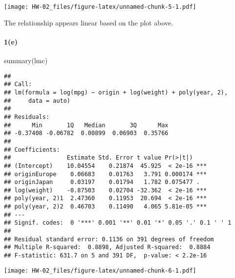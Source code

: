 \documentclass[
]{article}
\newenvironment{Shaded}{\begin{snugshade}}{\end{snugshade}}
\newcommand{\AttributeTok}[1]{\textcolor[rgb]{0.77,0.63,0.00}{#1}}
\newcommand{\DecValTok}[1]{\textcolor[rgb]{0.00,0.00,0.81}{#1}}
\newcommand{\FunctionTok}[1]{\textcolor[rgb]{0.00,0.00,0.00}{#1}}
\newcommand{\NormalTok}[1]{#1}
\newcommand{\SpecialCharTok}[1]{\textcolor[rgb]{0.00,0.00,0.00}{#1}}
\begin{document}
\texttt{[image: HW-02\_files/figure-latex/unnamed-chunk-5-1.pdf]}

The relationship appears linear based on the plot above.

\hypertarget{e}{%
\paragraph{1(e)}\label{e}}

\begin{Shaded}
\begin{Highlighting}[]
\FunctionTok{summary}\NormalTok{(lmc)}
\end{Highlighting}
\end{Shaded}

\begin{verbatim}
## 
## Call:
## lm(formula = log(mpg) ~ origin + log(weight) + poly(year, 2), 
##     data = auto)
## 
## Residuals:
##      Min       1Q   Median       3Q      Max 
## -0.37408 -0.06782  0.00899  0.06903  0.35766 
## 
## Coefficients:
##                Estimate Std. Error t value Pr(>|t|)    
## (Intercept)    10.04554    0.21874  45.925  < 2e-16 ***
## originEurope    0.06683    0.01763   3.791 0.000174 ***
## originJapan     0.03197    0.01794   1.782 0.075477 .  
## log(weight)    -0.87503    0.02704 -32.362  < 2e-16 ***
## poly(year, 2)1  2.47360    0.11953  20.694  < 2e-16 ***
## poly(year, 2)2  0.46703    0.11490   4.065 5.81e-05 ***
## ---
## Signif. codes:  0 '***' 0.001 '**' 0.01 '*' 0.05 '.' 0.1 ' ' 1
## 
## Residual standard error: 0.1136 on 391 degrees of freedom
## Multiple R-squared:  0.8898, Adjusted R-squared:  0.8884 
## F-statistic: 631.7 on 5 and 391 DF,  p-value: < 2.2e-16
\end{verbatim}

\begin{Shaded}
\end{Shaded}

\texttt{[image: HW-02\_files/figure-latex/unnamed-chunk-6-1.pdf]}
\end{document}
